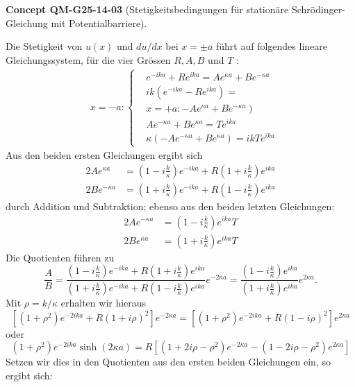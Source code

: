 \documentclass[10pt, letterpaper]{article}
\newcommand{\CustomHeading}[3]{%
  \par\medskip\noindent%
  \textbf{#1 #2} \textnormal{(#3)}.\enskip%
}
\newenvironment{CONC}[2]{\CustomHeading{Concept}{#1}{#2}}{}
\begin{document}
\begin{CONC}{QM-G25-14-03}{Stetigkeitsbedingungen für stationäre Schrödinger-Gleichung mit Potentialbarriere}
Die Stetigkeit von $u(x)$ und $d u / d x$ bei $x= \pm a$ führt auf folgendes lineare Gleichungssystem, für die vier Grössen $R, A, B$ und $T$ :
$$
\begin{aligned}
& x=-a:\left\{\begin{aligned}
& e^{-i k a}+R e^{i k a}=A e^{\kappa a}+B e^{-\kappa a} \\
& i k\left(e^{-i k a}-R e^{i k a}\right)= \\
&\left.x=+a:-A e^{\kappa a}+B e^{-\kappa a}\right) \\
& A e^{-\kappa a}+B e^{\kappa a}=T e^{i k a} \\
& \kappa\left(-A e^{-\kappa a}+B e^{\kappa a}\right)=i k T e^{i k a}
\end{aligned}\right.
\end{aligned}
$$
Aus den beiden ersten Gleichungen ergibt sich
$$
\begin{aligned}
2 A e^{\kappa a} & =\left(1-i \frac{k}{\kappa}\right) e^{-i k a}+R\left(1+i \frac{k}{\kappa}\right) e^{i k a} \\
2 B e^{-\kappa a} & =\left(1+i \frac{k}{\kappa}\right) e^{-i k a}+R\left(1-i \frac{k}{\kappa}\right) e^{i k a}
\end{aligned}
$$
durch Addition und Subtraktion; ebenso aus den beiden letzten Gleichungen:
$$
\begin{aligned}
2 A e^{-\kappa a} & =\left(1-i \frac{k}{\kappa}\right) e^{i k a} T \\
2 B e^{\kappa a} & =\left(1+i \frac{k}{\kappa}\right) e^{i k a} T
\end{aligned}
$$
Die Quotienten führen zu
$$
\frac{A}{B}=\frac{\left(1-i \frac{k}{\kappa}\right) e^{-i k a}+R\left(1+i \frac{k}{\kappa}\right) e^{i k a}}{\left(1+i \frac{k}{\kappa}\right) e^{-i k a}+R\left(1-i \frac{k}{\kappa}\right) e^{i k a}} e^{-2 \kappa a}=\frac{\left(1-i \frac{k}{\kappa}\right) e^{i k a}}{\left(1+i \frac{k}{\kappa}\right) e^{i k a}} e^{2 \kappa a} .
$$
Mit $\rho=k / \kappa$ erhalten wir hieraus
$$
\left[\left(1+\rho^{2}\right) e^{-2 i k a}+R(1+i \rho)^{2}\right] e^{-2 \kappa a}=\left[\left(1+\rho^{2}\right) e^{-2 i k a}+R(1-i \rho)^{2}\right] e^{2 \kappa a}
$$
oder
$$
\left(1+\rho^{2}\right) e^{-2 i k a} \sinh (2 \kappa a)=R\left[\left(1+2 i \rho-\rho^{2}\right) e^{-2 \kappa a}-\left(1-2 i \rho-\rho^{2}\right) e^{2 \kappa a}\right]
$$
Setzen wir dies in den Quotienten aus den ersten beiden Gleichungen ein, so ergibt sich:

\end{CONC}
\end{document}
